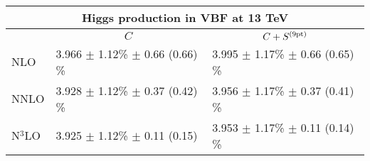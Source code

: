 \renewcommand*{\arraystretch}{1.7}
\begin{tabular}{l l l}
\multicolumn{3}{c}{Higgs production in VBF at 13 TeV }\\
\toprule
           & \multicolumn{1}{c}{$C$} & \multicolumn{1}{c}{$C+S^{(\rm 9pt)}$} \\
\midrule
NLO & 3.966 $\pm$  1.12\% $\pm$ 0.66 (0.66) \% &  3.995 $\pm$  1.17\% $\pm$ 0.66 (0.65) \% \\
NNLO & 3.928 $\pm$  1.12\% $\pm$ 0.37 (0.42) \% &  3.956 $\pm$  1.17\% $\pm$ 0.37 (0.41) \%  \\
N$^3$LO & 3.925 $\pm$  1.12\% $\pm$ 0.11 (0.15)   &
3.953 $\pm$  1.17\% $\pm$ 0.11 (0.14) \%  \\
\bottomrule
\end{tabular}

